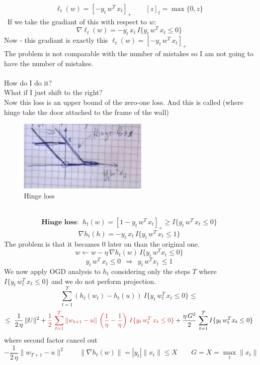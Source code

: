 \documentclass[../main.tex]{subfiles}
\begin{document}
$$
\ell_t(w) = \left[ -y_t \, w^T \, x_t \right]_+ \qquad \left[ z \right]_t = \max \{0,z\}
$$ \
If we take the gradiant of this with respect to $w$:
$$
\nabla \ell_t(w) = -y_t \, x_t \, I \{ y_t \, w^T \, x_t \leq 0 \}
$$
Now - this gradiant is exactly this $\ell_t(w) = \left[ -y_t \, w^T \, x_t \right]_+ $ 
\\
The problem is not comparable with the number of mistakes so I am not going to have the number of mistakes. 
\\\\How do I do it? 
\\
What if I just shift to the right? \\
Now this loss is an upper bound of the zero-one loss. And this is called  (where hinge take the door attached to the frame of the wall)\\
\begin{figure}[h]
    \centering
    \includegraphics[width=0.4\linewidth]{../img/lez16-img2.JPG}
    \caption{Hinge loss}
\end{figure}\\
$$
\textbf{Hinge loss: } \ h_t(w) = \left[ 1 - y_t \, w^T \, x_t \right]_+ \geq I \{ y_t \, w^T \, x_t \leq 0 \}
$$
$$
\nabla h_t(h) = - y_t \, x_t \, I\{y_t \, w^T \, x_t \leq 1 \}
$$
The problem is that it becames 0 later on than the original one.
\\
$$
w \leftarrow w - \eta \, \nabla h_t(w) \, I \{ y_t \, w^T x_t \leq 0\}
$$
$$
y_t \, w^T \, x_t \leq 0 \ \ \Rightarrow \ \ y_t \, w^T x_t \, \leq 1
$$
We now apply OGD analysis to $h_t$ considering only the steps $T$ where $I \{ y_t \, w_t^T \, x_t \leq 0  \} 
$ and we do not perform projection. 
$$
\sum_{t=1}^T \left( h_t \left(w_t \right) - h_t(u) \right) \ I\{y_t \, w_t^T \, x_t \leq 0 \} \leq 
$$
$$ \leq \ \frac{1}{2 \, \eta} \, \| U \|^2 + 
\red{
\frac{1}{2} \, \sum_{t=1}^T \| w_{t+1} - u \| \, \left( \frac{1}{\eta} - \frac{1}{\eta} \right) \, I \{y_t \, w_t^T \, x_t \leq 0 \} 
}
+ \frac{\eta \, G^2}{2} \, \sum_{t=1}^T I \{y_t \, w_t^T x_t \leq 0 \}
$$
where second factor cancel out
$$
- \frac{1}{2 \, \eta} \| w_{T+1} - u \|^2 \qquad \| \nabla h_t(w) \| = |y_t| \| x_t \| \leq X \qquad G = X = \max_t \| x_t \|
$$
\end{document}
